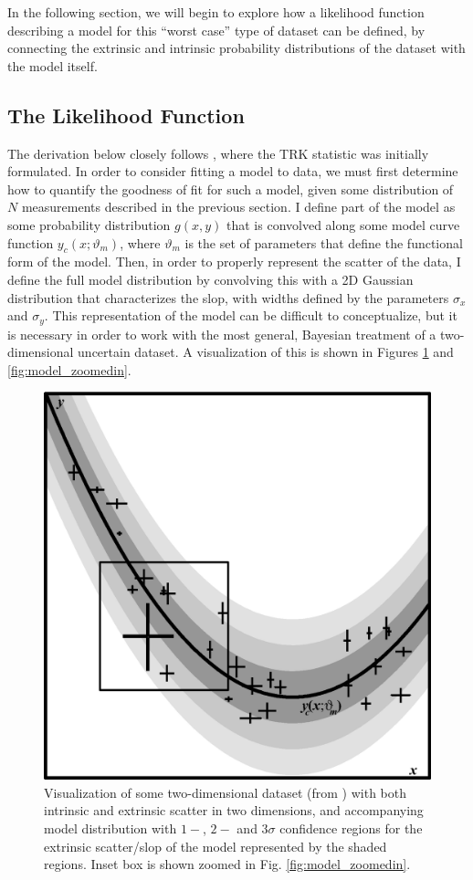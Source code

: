 In the following section, we will begin to explore how a likelihood function describing a model for this ``worst case'' type of dataset can be defined, by connecting the extrinsic and intrinsic probability distributions of the dataset with the model itself.

\subsection{The Likelihood Function}
The derivation below closely follows \textcite{trotter}, where the TRK statistic was initially formulated. In order to consider fitting a model to data, we must first determine how to quantify the goodness of fit for such a model, given some distribution of $N$ measurements described in the previous section. I define part of the model as some probability distribution $g(x,y)$ that is convolved along some model curve function $y_c(x;\vartheta_m)$, where $\vartheta_m$ is the set of parameters that define the functional form of the model. Then, in order to properly represent the scatter of the data, I define the full model distribution by convolving this with a 2D Gaussian distribution that characterizes the slop, with widths defined by the parameters $\sigma_x$ and $\sigma_y$. This representation of the model can be difficult to conceptualize, but it is necessary in order to work with the most general, Bayesian treatment of a two-dimensional uncertain dataset. A visualization of this is shown in Figures \ref{fig:model} and \ref{fig:model_zoomedin}.

\begin{figure}
    \centering
    \includegraphics[width=0.8\linewidth]{figures/model.eps}
    \caption{Visualization of some two-dimensional dataset (from \textcite{trotter}) with both intrinsic and extrinsic scatter in two dimensions, and accompanying model distribution with $1-$, $2-$ and $3\sigma$ confidence regions for the extrinsic scatter/slop of the model represented by the shaded regions. Inset box is shown zoomed in Fig. \ref{fig:model_zoomedin}.}
    \label{fig:model}
\end{figure}

